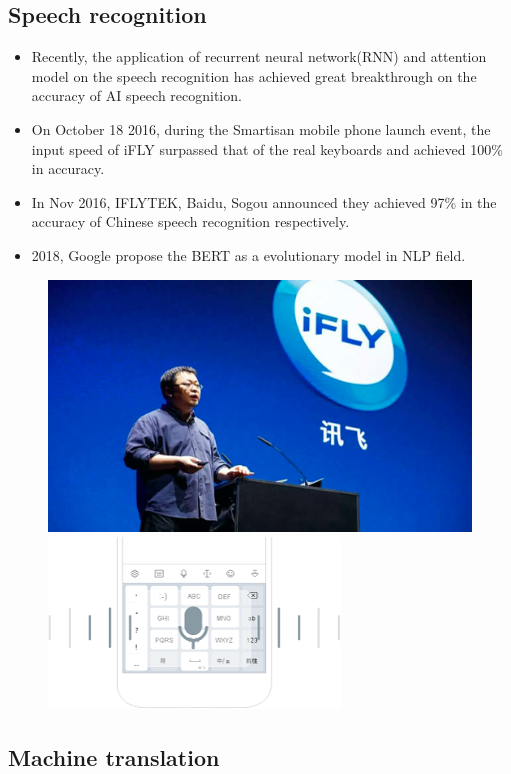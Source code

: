 \subsection{Speech recognition}
\begin{itemize}
\item Recently, the application of recurrent neural network(RNN) and attention model on the speech recognition has achieved great breakthrough on the accuracy of AI speech recognition.

\item On October 18 2016, during the Smartisan mobile phone launch event, the input speed of iFLY surpassed that of the real keyboards and achieved 100\% in accuracy.

\item In Nov 2016, IFLYTEK, Baidu, Sogou announced they achieved 97\% in the accuracy of Chinese speech recognition respectively.


\item 2018, Google propose the BERT as a evolutionary model in NLP field.
\end{itemize}
\begin{figure}[H]
\centering
\includegraphics[width=.6\textwidth]{figures/SpeechRecognition1}\\
\includegraphics[width=.6\textwidth]{figures/SpeechRecognition2}
\end{figure}



\subsection{Machine translation}

